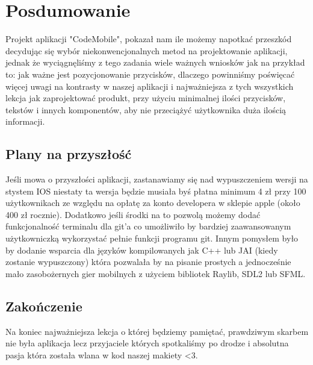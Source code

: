 \chapter{Posdumowanie}

Projekt aplikacji "CodeMobile", pokazał nam ile możemy napotkać przeszkód decydując się wybór niekonwencjonalnych metod na projektowanie aplikacji, jednak że wyciągnęliśmy z tego zadania wiele ważnych wniosków jak na przykład to: jak ważne jest pozycjonowanie przycisków, dlaczego powinniśmy poświęcać więcej uwagi na kontrasty w naszej aplikacji i najważniejsza z tych wszystkich lekcja jak zaprojektować produkt, przy użyciu minimalnej ilości przycisków, tekstów i innych komponentów, aby nie przeciążyć użytkownika duża ilością informacji.
\section{Plany na przyszłość}
Jeśli mowa o przyszłości aplikacji, zastanawiamy się nad wypuszczeniem wersji na stystem IOS niestaty ta wersja będzie musiała byś płatna minimum 4 zł przy 100 użytkownikach ze względu na opłatę za konto developera w sklepie apple (około 400 zł rocznie).
\newline\newline
Dodatkowo jeśli środki na to pozwolą możemy dodać funkcjonalność terminalu dla git'a co umożliwiło by bardziej zaawansowanym użytkowniczką wykorzystać pełnie funkcji programu git.
\newline\newline
Innym pomysłem było by dodanie wsparcia dla języków kompilowanych jak C++ lub JAI (kiedy zostanie wypuszczony) która pozwalała by na pisanie prostych a jednocześnie mało zasobożernych gier mobilnych z użyciem bibliotek Raylib, SDL2 lub SFML.
\section{Zakończenie}
Na koniec najważniejsza lekcja o której będziemy pamiętać, prawdziwym skarbem nie była aplikacja lecz przyjaciele których spotkaliśmy po drodze i absolutna pasja która została wlana w kod naszej makiety <3.

